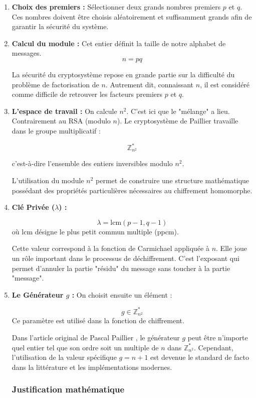 \documentclass[12pt,a4paper]{report}
\begin{document}
\begin{enumerate}
    \item \textbf{Choix des premiers :} Sélectionner deux grands nombres premiers $p$ et $q$.
    Ces nombres doivent être choisis aléatoirement et suffisamment grands afin de garantir
la sécurité du système.
    \item \textbf{Calcul du module :}
     Cet entier définit la taille de notre alphabet de messages.\[
n = pq
\]

 La sécurité du cryptosystème repose en grande partie sur la difficulté du problème de factorisation de $n$. Autrement dit, connaissant $n$, il est considéré comme difficile de retrouver les facteurs premiers $p$ et $q$.
    \item \textbf{L'espace de travail :} On calcule $n^2$. C'est ici que le "mélange" a lieu. Contrairement au RSA (modulo $n$). Le cryptosystème de Paillier travaille dans le groupe multiplicatif :

\[
\mathbb{Z}_{n^2}^{*}
\]

c'est-à-dire l'ensemble des entiers inversibles modulo $n^2$.

L'utilisation du module $n^2$ permet de construire une structure mathématique
possédant des propriétés particulières nécessaires au chiffrement homomorphe.
   
    \item \textbf{Clé Privée ($\lambda$) :} 



\[ \lambda = \mathrm{lcm}(p-1, q-1)\] 
où $\mathrm{lcm}$ désigne le plus petit commun multiple (ppcm).


Cette valeur correspond à la fonction de Carmichael appliquée à $n$.  
Elle joue un rôle important dans le processus de déchiffrement.
C'est l'exposant qui permet d'annuler la partie "résidu" du message sans toucher à la partie "message".
    \item \textbf{Le Générateur $g$ :} On choisit ensuite un élément :

\[
g \in \mathbb{Z}_{n^2}^{*}
\] 
Ce paramètre est utilisé dans la fonction de chiffrement.


Dans l'article original de Pascal Paillier \cite{paillier1999}, le générateur $g$ peut être n'importe quel entier tel que son ordre soit un multiple de $n$ dans $\mathbb{Z}^*_{n^2}$. Cependant, l'utilisation de la valeur spécifique $g = n+1$ est devenue le standard de facto dans la littérature et les implémentations modernes.

\subsubsection{Justification mathématique}


\end{enumerate}
\end{document}
